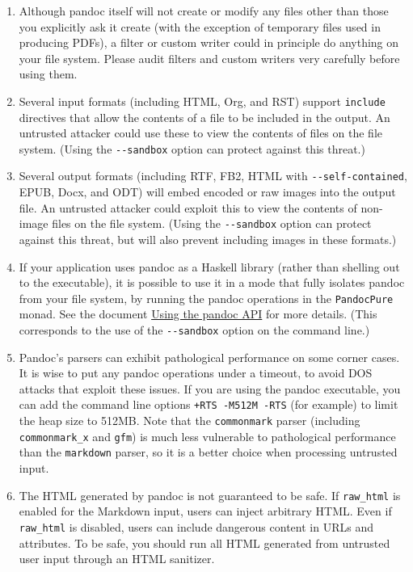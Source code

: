 \documentclass[
]{article}
\begin{document}
\begin{enumerate}
\def\labelenumi{\arabic{enumi}.}
\item
  Although pandoc itself will not create or modify any files other than
  those you explicitly ask it create (with the exception of temporary
  files used in producing PDFs), a filter or custom writer could in
  principle do anything on your file system. Please audit filters and
  custom writers very carefully before using them.
\item
  Several input formats (including HTML, Org, and RST) support
  \texttt{include} directives that allow the contents of a file to be
  included in the output. An untrusted attacker could use these to view
  the contents of files on the file system. (Using the
  \texttt{-\/-sandbox} option can protect against this threat.)
\item
  Several output formats (including RTF, FB2, HTML with
  \texttt{-\/-self-contained}, EPUB, Docx, and ODT) will embed encoded
  or raw images into the output file. An untrusted attacker could
  exploit this to view the contents of non-image files on the file
  system. (Using the \texttt{-\/-sandbox} option can protect against
  this threat, but will also prevent including images in these formats.)
\item
  If your application uses pandoc as a Haskell library (rather than
  shelling out to the executable), it is possible to use it in a mode
  that fully isolates pandoc from your file system, by running the
  pandoc operations in the \texttt{PandocPure} monad. See the document
  \href{https://pandoc.org/using-the-pandoc-api.html}{Using the pandoc
  API} for more details. (This corresponds to the use of the
  \texttt{-\/-sandbox} option on the command line.)
\item
  Pandoc's parsers can exhibit pathological performance on some corner
  cases. It is wise to put any pandoc operations under a timeout, to
  avoid DOS attacks that exploit these issues. If you are using the
  pandoc executable, you can add the command line options
  \texttt{+RTS\ -M512M\ -RTS} (for example) to limit the heap size to
  512MB. Note that the \texttt{commonmark} parser (including
  \texttt{commonmark\_x} and \texttt{gfm}) is much less vulnerable to
  pathological performance than the \texttt{markdown} parser, so it is a
  better choice when processing untrusted input.
\item
  The HTML generated by pandoc is not guaranteed to be safe. If
  \texttt{raw\_html} is enabled for the Markdown input, users can inject
  arbitrary HTML. Even if \texttt{raw\_html} is disabled, users can
  include dangerous content in URLs and attributes. To be safe, you
  should run all HTML generated from untrusted user input through an
  HTML sanitizer.
\end{enumerate}
\end{document}

